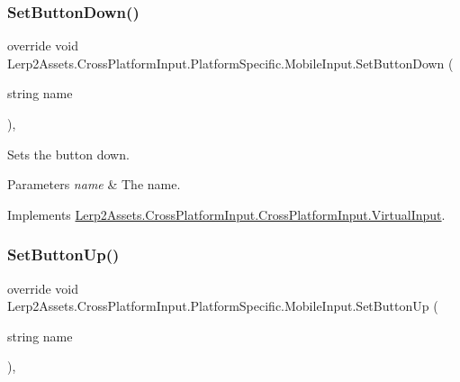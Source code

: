 \subsubsection{\texorpdfstring{Set\+Button\+Down()}{SetButtonDown()}}
{\footnotesize\ttfamily override void Lerp2\+Assets.\+Cross\+Platform\+Input.\+Platform\+Specific.\+Mobile\+Input.\+Set\+Button\+Down (\begin{DoxyParamCaption}\item[{string}]{name }\end{DoxyParamCaption})\hspace{0.3cm}{\ttfamily [inline]}, {\ttfamily [virtual]}}



Sets the button down. 


\begin{DoxyParams}{Parameters}
{\em name} & The name.\\
\hline
\end{DoxyParams}


Implements \hyperlink{class_lerp2_assets_1_1_cross_platform_input_1_1_cross_platform_input_1_1_virtual_input_a05c1d0c7a50c30a22c52bf460ec6a17a}{Lerp2\+Assets.\+Cross\+Platform\+Input.\+Cross\+Platform\+Input.\+Virtual\+Input}.

\mbox{\label{class_lerp2_assets_1_1_cross_platform_input_1_1_platform_specific_1_1_mobile_input_aadfa727ea04d9c51fb3e443dc7b67466}} 
\subsubsection{\texorpdfstring{Set\+Button\+Up()}{SetButtonUp()}}
{\footnotesize\ttfamily override void Lerp2\+Assets.\+Cross\+Platform\+Input.\+Platform\+Specific.\+Mobile\+Input.\+Set\+Button\+Up (\begin{DoxyParamCaption}\item[{string}]{name }\end{DoxyParamCaption})\hspace{0.3cm}{\ttfamily [inline]}, {\ttfamily [virtual]}}




